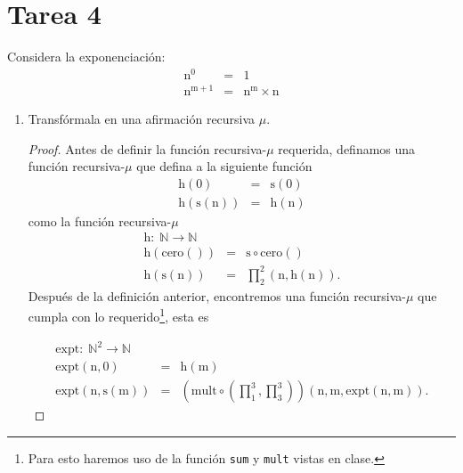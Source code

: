 \documentclass{article}
\newcommand{\code}[1]{\textcolor{white!25!black}{\texttt{#1}}}
\begin{document}
\section*{\LARGE{Tarea 4}}
Considera la exponenciación:
\begin{eqnarray*}
  \mathrm{n^{0}} &=& \mathrm{1}\\
  \mathrm{n^{m + 1}} &=& \mathrm{n^m \times n}
\end{eqnarray*}
\begin{enumerate}
\item Transfórmala en una afirmación recursiva $\mu$.
  \begin{proof}
    Antes de definir la función recursiva-$\mu$ requerida, definamos
    una función recursiva-$\mu$ que defina a la siguiente función
    \begin{eqnarray*}
      \mathrm{h(0)} &=& \mathrm{s(0)}\\
      \mathrm{h(s(n))} &=& \mathrm{h(n)}
    \end{eqnarray*}
    como la función recursiva-$\mu$
    \begin{eqnarray*}
      \mathrm{h:}\; \mathbb{N} \rightarrow \mathbb{N} &&\\
      \mathrm{h(\text{cero}())} &=& \mathrm{s \circ cero()}\\
      \mathrm{h(s(n))} &=& \mathrm{\prod_{2}^{2}(n, h(n))}.
    \end{eqnarray*}
    Después de la definición anterior, encontremos una función recursiva-$\mu$
    que cumpla con lo requerido\footnote{Para esto haremos uso de la función
    \code{sum} y \code{mult} vistas en clase.}, esta es
    \begin{center}
    \end{center}      
    \begin{eqnarray*}
      \mathrm{expt:}\; \mathbb{N}^2 \rightarrow \mathbb{N} &&\\
      \mathrm{expt(n, 0)} &=& \mathrm{h(m)}\\
      \mathrm{expt(n, s(m))} &=& \mathrm{\left(mult \circ \left(\prod_{1}^{3}, \prod_{3}^{3}\right)\right)(n, m, expt(n, m))}.

\end{eqnarray*}
\end{proof}
\end{enumerate}
\end{document}
